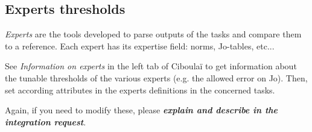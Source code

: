 \documentclass[a4paper,10pt,twoside]{article}
\begin{document}
\subsection{Experts thresholds}

\textit{Experts} are the tools developed to parse outputs of the tasks and compare them to a reference. Each expert has its expertise field: norms, Jo-tables, etc...

See \textit{Information on experts} in the left tab of Ciboulaï to get information about the tunable thresholds of the various experts (e.g. the allowed error on Jo).
Then, set according attributes in the experts definitions in the concerned tasks.

Again, if you need to modify these, please \textit{\textbf{explain and describe in the integration request}}.
\end{document}
